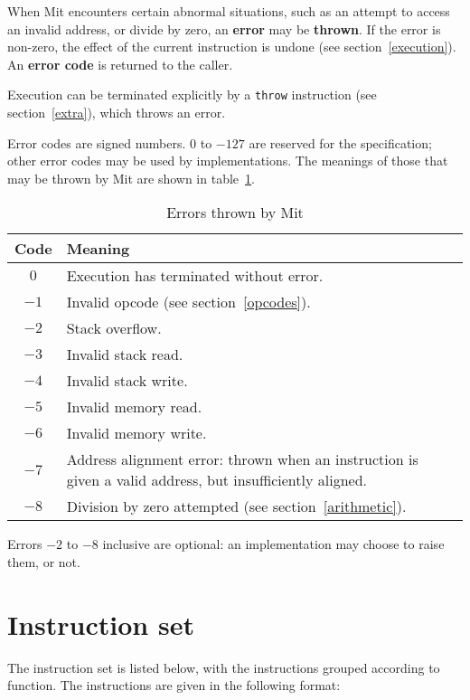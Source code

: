 \documentclass[a4paper]{article}
\begin{document}
When Mit encounters certain abnormal situations, such as an attempt to access an invalid address, or divide by zero, an {\bf error} may be {\bf thrown}. If the error is non-zero, the effect of the current instruction is undone (see section~\ref{execution}). An {\bf error code} is returned to the caller.

Execution can be terminated explicitly by a {\tt throw} instruction (see section~\ref{extra}), which throws an error.

Error codes are signed numbers. $0$ to $-127$ are reserved for the specification; other error codes may be used by implementations. The meanings of those that may be thrown by Mit are shown in table~\ref{errortable}.

\begin{table}[htbp]
\begin{center}
\begin{tabular}{cp{4in}} \toprule
\bf Code & \bf Meaning \\ \midrule
$0$ & Execution has terminated without error. \\
$-1$ & Invalid opcode (see section~\ref{opcodes}). \\
$-2$ & Stack overflow. \\
$-3$ & Invalid stack read. \\
$-4$ & Invalid stack write. \\
$-5$ & Invalid memory read. \\
$-6$ & Invalid memory write. \\
$-7$ & Address alignment error: thrown when an instruction is given a valid address, but insufficiently aligned. \\
$-8$ & Division by zero attempted (see section~\ref{arithmetic}). \\
 \bottomrule
\end{tabular}
\caption{\label{errortable}Errors thrown by Mit}
\end{center}
\end{table}

Errors $-2$ to $-8$ inclusive are optional: an implementation may choose to raise them, or not.


\section{Instruction set}
\label{instset}

The instruction set is listed below,
with the instructions grouped according to function. The
instructions are given in the following format:
\end{document}
